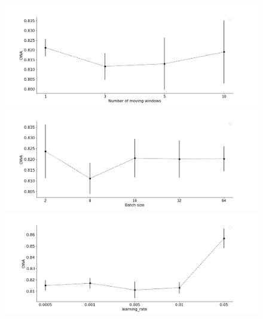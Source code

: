 \documentclass[review]{elsarticle}
\begin{document}
 
\begin{figure}
\centering
  \includegraphics[width=1.\linewidth]{figure/m4_nb_of_window}
  \includegraphics[width=1.\linewidth]{figure/m4_batch_size}
  \includegraphics[width=1.\linewidth]{figure/m4_learning_rate}

\end{figure}
\end{document}
